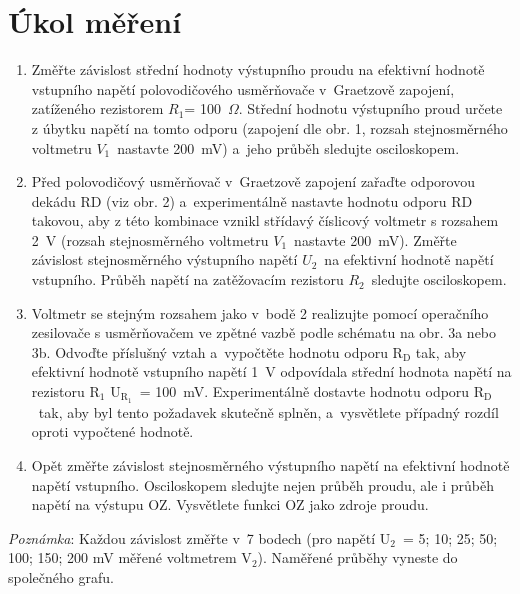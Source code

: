 \documentclass[a4paper,12pt]{article}   %
\newcommand{\tsub}[1]{$_\textrm{#1}$}
\newcommand{\tohm}{$\Omega$}
\newcommand{\ri}{$R_1$}
\newcommand{\rii}{$R_2$}
\newcommand{\uii}{$U_2$}
\newcommand{\vii}{$V_1$}
\begin{document}
\section{Úkol měření}
\label{zadani}
\begin{enumerate}
    \item Změřte závislost střední hodnoty výstupního proudu na efektivní hodnotě vstupního napětí polovodičového usměrňovače v~Graetzově zapojení, zatíženého rezistorem \ri = 100~\tohm. Střední hodnotu výstupního proud určete z úbytku napětí na tomto odporu (zapojení dle obr. 1, rozsah stejnosměrného voltmetru \vii~nastavte 200~mV) a~jeho průběh sledujte osciloskopem.
    \item Před polovodičový usměrňovač v~Graetzově zapojení zařaďte odporovou dekádu RD (viz obr. 2) a~experimentálně nastavte hodnotu odporu RD takovou, aby z této kombinace vznikl střídavý číslicový voltmetr s rozsahem 2~V (rozsah stejnosměrného voltmetru \vii~nastavte 200~mV). Změřte závislost stejnosměrného výstupního napětí \uii~na efektivní hodnotě napětí vstupního. Průběh napětí na zatěžovacím rezistoru \rii~sledujte osciloskopem.
    \item Voltmetr se stejným rozsahem jako v~bodě 2 realizujte pomocí operačního zesilovače s usměrňovačem ve zpětné vazbě podle schématu na obr. 3a nebo 3b. Odvoďte příslušný vztah a~vypočtěte hodnotu odporu R\tsub{D} tak, aby efektivní hodnotě vstupního napětí 1~V odpovídala střední hodnota napětí na rezistoru R\tsub{1} U\tsub{R\tsub{1}}~= 100~mV. Experimentálně dostavte hodnotu odporu R\tsub{D}~tak, aby byl tento požadavek skutečně splněn, a~vysvětlete případný rozdíl oproti vypočtené hodnotě.
    \item Opět změřte závislost stejnosměrného výstupního napětí na efektivní hodnotě napětí vstupního. Osciloskopem sledujte nejen průběh proudu, ale i průběh napětí na výstupu OZ. Vysvětlete funkci OZ jako zdroje proudu.
\end{enumerate}
\textit{Poznámka}: Každou závislost změřte v~7 bodech (pro napětí U\tsub{2}~= 5; 10; 25; 50; 100; 150; 200 mV měřené voltmetrem V\tsub{2}). Naměřené průběhy vyneste do společného grafu.
\end{document}
